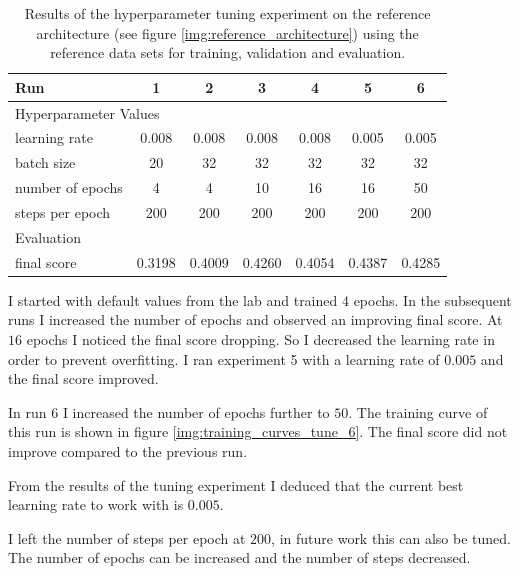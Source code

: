\documentclass[11pt, onecolumn, oneside, reqno]{article}
\begin{document}
{{{\renewcommand{\arraystretch}{2}%
\begin{table}
\centering
\begin{tabular}{|l|c|c|c|c|c|c|}
\hline 
Run & 1 & 2 & 3 & 4 & 5 & 6 \\
\hline  
\multicolumn{7}{l}{Hyperparameter Values}\\
\hline
learning rate    & 0.008 & 0.008 & 0.008 & 0.008 & 0.005 & 0.005 \\
batch size       & 20    & 32    & 32    & 32    & 32    & 32    \\
number of epochs & 4     & 4     & 10    & 16    & 16    & 50    \\
steps per epoch  & 200   & 200   & 200   & 200   & 200   & 200   \\
\hline 
\multicolumn{7}{l}{Evaluation}\\
\hline
final score & 0.3198 & 0.4009 & 0.4260 & 0.4054 & 0.4387 & 0.4285 \\
\hline 
\end{tabular} 
\caption[Hyperparameter tuning experiment]{Results of the hyperparameter tuning experiment on the reference architecture (see figure \ref{img:reference_architecture}) using the reference data sets for training, validation and evaluation.}
\label{tbl:hyperparameter_tuning}
\end{table}

I started with default values from the lab and trained $4$ epochs. In the subsequent runs I increased the number of epochs and observed an improving final score. At $16$ epochs I noticed the final score dropping. So I decreased the learning rate in order to prevent overfitting. I ran experiment 5 with a learning rate of $0.005$ and the final score improved.

In run $6$ I increased the number of epochs further to $50$. The training curve of this run is shown in figure \ref{img:training_curves_tune_6}. The final score did not improve compared to the previous run.

From the results of the tuning experiment I deduced that the current best learning rate to work with is $0.005$. 

I left the number of steps per epoch at $200$, in future work this can also be tuned. The number of epochs can be increased and the number of steps decreased.

}}}
\end{document}
